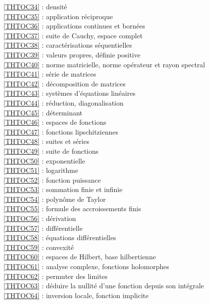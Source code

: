 \ref {THTOC34} : densité\\
\ref {THTOC35} : application réciproque\\
\ref {THTOC36} : applications continues et bornées\\
\ref {THTOC37} : suite de Cauchy, espace complet\\
\ref {THTOC38} : caractérisations séquentielles\\
\ref {THTOC39} : valeurs propres, définie positive\\
\ref {THTOC40} : norme matricielle, norme opérateur et rayon spectral\\
\ref {THTOC41} : série de matrices\\
\ref {THTOC42} : décomposition de matrices\\
\ref {THTOC43} : systèmes d'équations linéaires\\
\ref {THTOC44} : réduction, diagonalisation\\
\ref {THTOC45} : déterminant\\
\ref {THTOC46} : espaces de fonctions\\
\ref {THTOC47} : fonctions lipschitziennes\\
\ref {THTOC48} : suites et séries\\
\ref {THTOC49} : suite de fonctions\\
\ref {THTOC50} : exponentielle\\
\ref {THTOC51} : logarithme\\
\ref {THTOC52} : fonction puissance\\
\ref {THTOC53} : sommation finie et infinie\\
\ref {THTOC54} : polynôme de Taylor\\
\ref {THTOC55} : formule des accroissements finis\\
\ref {THTOC56} : dérivation\\
\ref {THTOC57} : différentielle\\
\ref {THTOC58} : équations différentielles\\
\ref {THTOC59} : convexité\\
\ref {THTOC60} : espaces de Hilbert, base hilbertienne\\
\ref {THTOC61} : analyse complexe, fonctions holomorphes\\
\ref {THTOC62} : permuter des limites\\
\ref {THTOC63} : déduire la nullité d'une fonction depuis son intégrale\\
\ref {THTOC64} : inversion locale, fonction implicite\\

